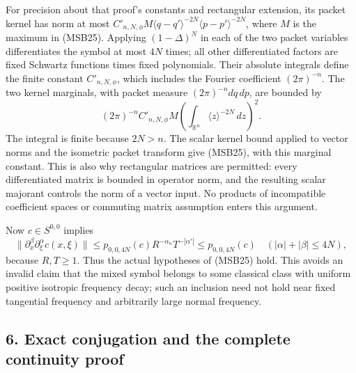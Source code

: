 \documentclass[
  11pt,
]{article}
\makeatletter
\let\ReaderOriginalAnchorStart\hyper@anchorstart
\let\ReaderOriginalAnchorEnd\hyper@anchorend
\let\ReaderPendingAliases\@empty
\def\ReaderArmAliases#1{\gdef\ReaderPendingAliases{#1}}
\def\hyper@anchorstart#1{\ReaderIfNativeAnchorTF{#1}{\ReaderPendingAliases\global\let\ReaderPendingAliases\@empty}{}\ReaderOriginalAnchorStart{#1}}
\makeatother
\begin{document}
For precision about that proof's constants and rectangular extension,
its packet kernel has norm at most
\(C'_{n,N,\phi}M\langle q-q'\rangle^{-2N}\langle p-p'\rangle^{-2N}\),
where \(M\) is the maximum in (MSB25). Applying \((1-\Delta)^N\) in each
of the two packet variables differentiates the symbol at most \(4N\)
times; all other differentiated factors are fixed Schwartz functions
times fixed polynomials. Their absolute integrals define the finite
constant \(C'_{n,N,\phi}\), which includes the Fourier coefficient
\((2\pi)^{-n}\). The two kernel marginals, with packet measure
\((2\pi)^{-n}dq\,dp\), are bounded by \[
 (2\pi)^{-n}C'_{n,N,\phi}M
       \left(\int_{\mathbb R^n}\langle z\rangle^{-2N}\,dz\right)^2.
 \tag{MSB26}
\] The integral is finite because \(2N>n\). The scalar kernel bound
applied to vector norms and the isometric packet transform give (MSB25),
with this marginal constant. This is also why rectangular matrices are
permitted: every differentiated matrix is bounded in operator norm, and
the resulting scalar majorant controls the norm of a vector input. No
products of incompatible coefficient spaces or commuting matrix
assumption enters this argument.

Now \(c\in S^{0,0}\) implies \[
 \|\partial_x^\beta\partial_\xi^\alpha c(x,\xi)\|
 \leq p_{0,0,4N}(c)R^{-\alpha_n}T^{-|\alpha'|}
 \leq p_{0,0,4N}(c)
 \quad(|\alpha|+|\beta|\leq4N),
 \tag{MSB27}
\] because \(R,T\geq1\). Thus the actual hypotheses of (MSB25) hold.
This avoids an invalid claim that the mixed symbol belongs to some
classical class with uniform positive isotropic frequency decay; such an
inclusion need not hold near fixed tangential frequency and arbitrarily
large normal frequency.

\ReaderArmAliases{\ReaderOriginalAnchorStart{AN03-MSB-006}\ReaderOriginalAnchorEnd\begingroup\expandafter\def\csname @currentHref\endcsname{AN03-MSB-006}\label{AN03-MSB-006}\endgroup\ReaderOriginalAnchorStart{an03-msb-006-exact-conjugation-and-the-complete-continuity-proof}\ReaderOriginalAnchorEnd\begingroup\expandafter\def\csname @currentHref\endcsname{an03-msb-006-exact-conjugation-and-the-complete-continuity-proof}\label{an03-msb-006-exact-conjugation-and-the-complete-continuity-proof}\endgroup\ReaderOriginalAnchorStart{6-exact-conjugation-and-the-complete-continuity-proof}\ReaderOriginalAnchorEnd\begingroup\expandafter\def\csname @currentHref\endcsname{6-exact-conjugation-and-the-complete-continuity-proof}\label{6-exact-conjugation-and-the-complete-continuity-proof}\endgroup}
\subsection{6. Exact conjugation and the complete continuity
proof}\label{exact-conjugation-and-the-complete-continuity-proof}
\end{document}
